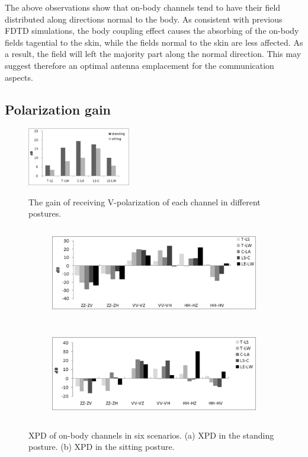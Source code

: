 \documentclass[conference]{IEEEtran}
\begin{document}
The above observations show that on-body channels tend to have their field distributed along directions normal to the body. As consistent with previous FDTD simulations, the body coupling effect causes the absorbing of the on-body fields tagential to the skin, while the fields normal to the skin are less affected. As a result, the field will left the majority part along the normal direction. This may suggest therefore an optimal antenna emplacement for the communication aspects.

\subsection{Polarization gain}
\begin{figure}[!t]
  \centering
  \includegraphics[width=0.4\textwidth]{figs/2.eps}\\
  \caption{The gain of receiving V-polarization of each channel in different postures.}
  \label{fig:2}
\end{figure}
\begin{figure}[!t]
\centering
\begin{subfigure}[t]{\textwidth}
\centering
\includegraphics[width=14cm,height=4cm]{figs/3a.eps}
\subcaption{}
\label{fig:3a}
\end{subfigure}
\begin{subfigure}[t]{\textwidth}
\centering
\includegraphics[width=14cm,height=4cm]{figs/3b.eps}
\subcaption{}
\label{fig:3b}
\end{subfigure}
\caption{XPD of on-body channels in six scenarios. (a) XPD in the standing posture. (b) XPD in the sitting posture.}
\label{fig:3}
\end{figure}
\end{document}
